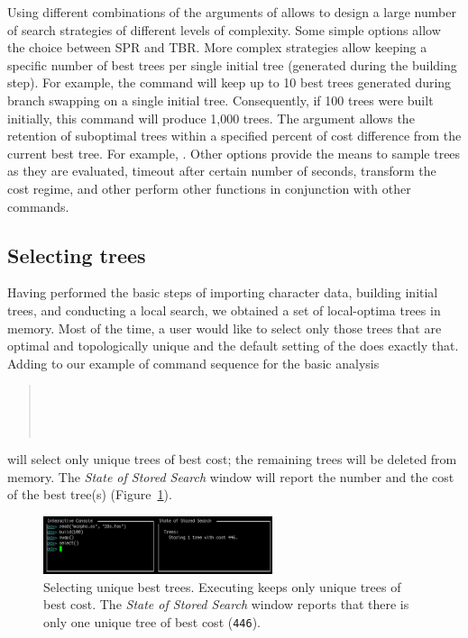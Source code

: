 Using different combinations of the arguments of  allows to design a  large number of search strategies of different levels of complexity. Some simple options allow the choice between SPR and TBR. More complex strategies allow keeping a specific number of best trees per single initial tree (generated during the building step). For example, the command  will keep up to 10 best trees generated during branch swapping on a single initial tree. Consequently, if 100 trees were built initially, this command will produce 1,000 trees. The argument  allows the retention of suboptimal trees within a specified percent of cost difference from the current best tree. For example, . Other options provide the means to sample trees as they are evaluated, timeout after certain number of seconds, transform the cost regime, and other perform other functions in conjunction with other \poy commands.

\subsection{Selecting trees}

Having performed the basic steps of importing character data, building initial trees, and conducting a local search, we obtained a set of local-optima trees in memory. Most of the time, a user would like to select only those trees that are optimal and topologically unique and the default setting of the  does exactly that. Adding  to our example of command sequence for the basic analysis 
\begin{quote}
 	\\
 	\\
	\\
\end{quote}
will select only unique trees of best cost; the remaining trees will be deleted from memory. The \emph{State of Stored Search} window will report the number and the cost of the best tree(s) (Figure~\ref{fig:select}).

\begin{figure}[]
    \begin{center}
        \includegraphics[width=0.6\textwidth]{figures/select.jpg}
    \end{center}
    \caption{Selecting unique best trees. Executing  keeps only unique trees of best cost. The \emph{State of Stored Search} window reports that there is only one unique tree of best cost (\texttt{446}).}
    \label{fig:select}
\end{figure}

